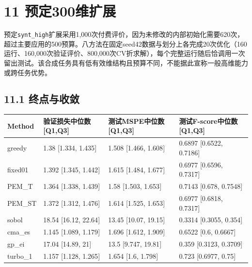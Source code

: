 \documentclass[11pt,a4paper]{article}
\begin{document}
\hypertarget{ux9884ux5b9a300ux7ef4ux6269ux5c55}{%
\section{11 预定300维扩展}\label{ux9884ux5b9a300ux7ef4ux6269ux5c55}}

预定\texttt{synt\_high}扩展采用1,000次付费评价，因为未修改的内部初始化需要620次，超过主要应用的500预算。八方法在固定seed42数据与划分上各完成20次优化（160运行、160,000次验证评价、800,000次CV折求解），每个完整运行随后恰调用一次留出测试。该合成任务具有低有效维结构且预算不同，不能据此宣称一般高维能力或跨任务优势。

\hypertarget{ux7ec8ux70b9ux4e0eux6536ux655b}{%
\subsection{11.1 终点与收敛}\label{ux7ec8ux70b9ux4e0eux6536ux655b}}

\par\noindent\begin{minipage}{\linewidth}

\begin{longtable}[]{@{}llll@{}}
\toprule
Method & 验证损失中位数{[}Q1,Q3{]} & 测试MSPE中位数{[}Q1,Q3{]} &
测试F-score中位数{[}Q1,Q3{]} \\
\midrule
\endhead
greedy & 1.38 {[}1.334, 1.435{]} & 1.508 {[}1.466, 1.608{]} & 0.6897
{[}0.6522, 0.7186{]} \\
fixed01 & 1.392 {[}1.345, 1.442{]} & 1.615 {[}1.484, 1.677{]} & 0.6977
{[}0.6596, 0.7317{]} \\
PEM\_T & 1.364 {[}1.338, 1.439{]} & 1.58 {[}1.503, 1.653{]} & 0.7143
{[}0.678, 0.7548{]} \\
PEM\_ST & 1.372 {[}1.312, 1.476{]} & 1.614 {[}1.525, 1.653{]} & 0.6977
{[}0.6818, 0.7317{]} \\
sobol & 18.54 {[}16.12, 22.64{]} & 13.45 {[}10.07, 19.15{]} & 0.3314
{[}0.3055, 0.354{]} \\
cma\_es & 1.145 {[}1.089, 1.179{]} & 1.696 {[}1.612, 1.909{]} & 0.6522
{[}0.6, 0.6667{]} \\
gp\_ei & 17.04 {[}14.89, 21{]} & 13.5 {[}9.747, 19.81{]} & 0.359
{[}0.3123, 0.3709{]} \\
turbo\_1 & 1.157 {[}1.128, 1.265{]} & 1.654 {[}1.6, 1.798{]} & 0.723
{[}0.6977, 0.75{]} \\
\bottomrule
\end{longtable}

\end{minipage}\par
\end{document}
